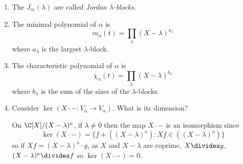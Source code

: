\documentclass[a4paper]{article}
\theoremstyle{definition}
\begin{document}
\begin{remark}\leavevmode
  \begin{enumerate}
  \item The \(J_m(\lambda)\) are called \emph{Jordan \(\lambda\)-blocks}.
  \item The minimal polynomial of \(\alpha\) is
    \[
      m_\alpha(t) = \prod_\lambda (X - \lambda)^{a_\lambda}
    \]
    where \(a_\lambda\) is the largest \(\lambda\)-block.
  \item The characteristic polynomial of \(\alpha\) is
    \[
      \chi_\alpha(t) = \prod_\lambda (X - \lambda)^{b_\lambda}
    \]
    where \(b_\lambda\) is the sum of the sizes of the \(\lambda\)-blocks.
  \item Consider \(\ker (X \cdot -: V_\alpha \to V_\alpha)\). What is its dimension?

    On \(\C[X]/(X - \lambda)^a\), if \(\lambda \neq 0\) then the map \(X \cdot -\) is an isomorphism since
    \[
      \ker (X \cdot -) = \{f + ((X - \lambda)^a): Xf \in ((X - \lambda)^a)\}
    \]
    so if \(Xf = (X - \lambda)^a \cdot g\), as \(X\) and \(X - \lambda\) are coprime, \(X \divides g\), \((X - \lambda)^a \divides f\) so \(\ker (X \cdot -) = 0\).


\end{enumerate}
\end{remark}
\end{document}
